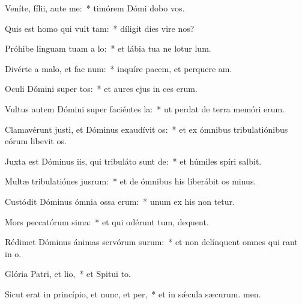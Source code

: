 \item Veníte, fílii, aute me:~* timórem Dómi dobo vos.
\item Quis est homo qui vult tam:~* díligit dies vire nos?
\item Próhibe linguam tuam a lo:~* et lábia tua ne lotur lum.
\item Divérte a malo, et fac num:~* inquíre pacem, et perquere am.
\item Oculi Dómini super tos:~* et aures ejus in ces erum.
\item Vultus autem Dómini super faciéntes la:~* ut perdat de terra memóri erum.
\item Clamavérunt justi, et Dóminus exaudívit os:~* et ex ómnibus tribulatiónibus eórum libevit os.
\item Juxta est Dóminus iis, qui tribuláto sunt de:~* et húmiles spíri salbit.
\item Multæ tribulatiónes jusrum:~* et de ómnibus his liberábit os minus.
\item Custódit Dóminus ómnia ossa erum:~* unum ex his non tetur.
\item Mors peccatórum sima:~* et qui odérunt tum, dequent.
\item Rédimet Dóminus ánimas servórum surum:~* et non delínquent omnes qui rant in o.
\item Glória Patri, et lio,~* et Spitui to.
\item Sicut erat in princípio, et nunc, et per,~* et in sǽcula sæcurum. men.
